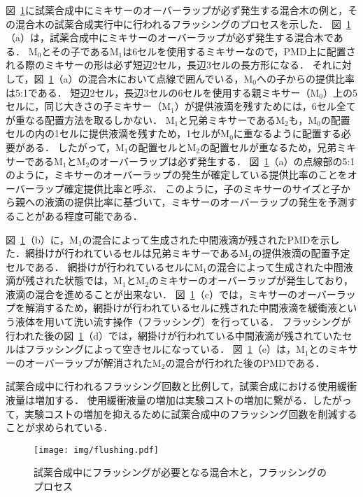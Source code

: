     図~\ref{fig:flushing}に試薬合成中にミキサーのオーバーラップが必ず発生する混合木の例と，その混合木の試薬合成実行中に行われるフラッシングのプロセスを示した．
    図~\ref{fig:flushing}（a）は，試薬合成中にミキサーのオーバーラップが必ず発生する混合木である．
    M$_0$とその子であるM$_1$は6セルを使用するミキサーなので，PMD上に配置される際のミキサーの形は必ず短辺2セル，長辺3セルの長方形になる．
    それに対して，図~\ref{fig:flushing}（a）の混合木において点線で囲んでいる，M$_0$への子からの提供比率は5:1である．
    短辺2セル，長辺3セルの6セルを使用する親ミキサー（M$_0$）上の5セルに，同じ大きさの子ミキサー（M$_1$）が提供液滴を残すためには，6セル全てが重なる配置方法を取るしかない．
    M$_1$と兄弟ミキサーであるM$_2$も，M$_0$の配置セルの内の1セルに提供液滴を残すため，1セルがM$_0$に重なるように配置する必要がある．
    したがって，M$_1$の配置セルとM$_2$の配置セルが重なるため，兄弟ミキサーであるM$_1$とM$_2$のオーバーラップは必ず発生する．
    図~\ref{fig:flushing}（a）の点線部の5:1のように，ミキサーのオーバーラップの発生が確定している提供比率のことをオーバーラップ確定提供比率と呼ぶ．
    このように，子のミキサーのサイズと子から親への液滴の提供比率に基づいて，ミキサーのオーバーラップの発生を予測することがある程度可能である．
    
    図~\ref{fig:flushing}（b）に，M$_1$の混合によって生成された中間液滴が残されたPMDを示した．網掛けが行われているセルは兄弟ミキサーであるM$_2$の提供液滴の配置予定セルである．
    網掛けが行われているセルにM$_1$の混合によって生成された中間液滴が残された状態では，M$_1$とM$_2$のミキサーのオーバーラップが発生しており，液滴の混合を進めることが出来ない．
    図~\ref{fig:flushing}（c）では，ミキサーのオーバーラップを解消するため，網掛けが行われているセルに残された中間液滴を緩衝液という液体を用いて洗い流す操作（フラッシング）を行っている．
    フラッシングが行われた後の図~\ref{fig:flushing}（d）では，網掛けが行われている中間液滴が残されていたセルはフラッシングによって空きセルになっている．
    図~\ref{fig:flushing}（e）は，M$_1$とのミキサーのオーバーラップが解消されたM$_2$の混合が行われた後のPMDである．

    試薬合成中に行われるフラッシング回数と比例して，試薬合成における使用緩衝液量は増加する．
    使用緩衝液量の増加は実験コストの増加に繋がる．したがって，実験コストの増加を抑えるために試薬合成中のフラッシング回数を削減することが求められている．


 \begin{figure}[tbp]
    \centering\texttt{[image: img/flushing.pdf]}
    \caption{試薬合成中にフラッシングが必要となる混合木と，フラッシングのプロセス}\label{fig:flushing}
\end{figure}

